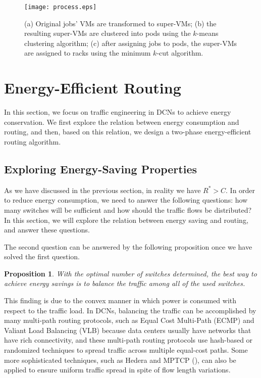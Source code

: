\documentclass[journal,single-space,two column,twoside,10pt]{IEEEtran}
\newtheorem{proposition}{Proposition}
\begin{document}
\begin{figure}[!t]
	\centering
	\texttt{[image: process.eps]}
	\caption{(a) Original jobs' VMs are transformed to super-VMs; (b) the resulting super-VMs are clustered into pods using the $k$-means clustering algorithm; (c) after assigning jobs to pods, the super-VMs are assigned to racks using the minimum $k$-cut algorithm.}
	\label{fig:vma} 
\end{figure}


\section{Energy-Efficient Routing}
\label{sec:route}

In this section, we focus on traffic engineering in DCNs to achieve energy conservation. We first explore the relation between energy consumption and routing, and then, based on this relation, we design a two-phase energy-efficient routing algorithm.


\subsection{Exploring Energy-Saving Properties}

As we have discussed in the previous section, in reality we have $R^* > C$. In order to reduce energy consumption, we need to answer the following questions: how many switches will be sufficient and how should the traffic flows be distributed? In this section, we will explore the relation between energy saving and routing, and answer these questions.

The second question can be answered by the following proposition once we have solved the first question.
\begin{proposition}
\label{prop:balance}
With the optimal number of switches determined, the best way to achieve energy savings is to balance the traffic among all of the used switches.
\end{proposition}

This finding is due to the convex manner in which power is consumed with respect to the traffic load. In DCNs, balancing the traffic can be accomplished by many multi-path routing protocols, such as Equal Cost Multi-Path (ECMP) and Valiant Load Balancing (VLB) because data centers usually have networks that have rich connectivity, and these multi-path routing protocols use hash-based or randomized techniques to spread traffic across multiple equal-cost paths. Some more sophisticated techniques, such as Hedera \cite{AL-Fares_Radhakrishnan-2010} and MPTCP (\cite{Han_Shakkottai-2006, Raiciu_Barre-2011}), can also be applied to ensure uniform traffic spread in spite of flow length variations.
\end{document}
